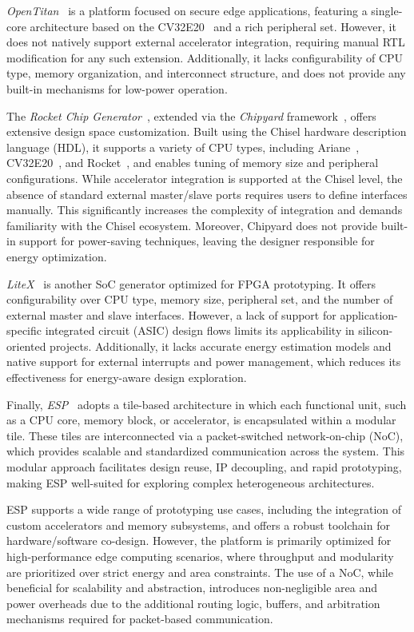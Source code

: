             \emph{OpenTitan}~\cite{opentitan} is a platform focused on secure edge applications, featuring a single-core architecture based on the CV32E20~\cite{zeroriscy} and a rich peripheral set. However, it does not natively support external accelerator integration, requiring manual RTL modification for any such extension. Additionally, it lacks configurability of CPU type, memory organization, and interconnect structure, and does not provide any built-in mechanisms for low-power operation.
            
            The \emph{Rocket Chip Generator}~\cite{rocket}, extended via the \emph{Chipyard} framework~\cite{chipyard}, offers extensive design space customization. Built using the Chisel hardware description language (HDL), it supports a variety of CPU types, including Ariane~\cite{ariane}, CV32E20~\cite{zeroriscy}, and Rocket~\cite{rocket}, and enables tuning of memory size and peripheral configurations. While accelerator integration is supported at the Chisel level, the absence of standard external master/slave ports requires users to define interfaces manually. This significantly increases the complexity of integration and demands familiarity with the Chisel ecosystem. Moreover, Chipyard does not provide built-in support for power-saving techniques, leaving the designer responsible for energy optimization.
            
            \emph{LiteX}~\cite{litex} is another SoC generator optimized for FPGA prototyping. It offers configurability over CPU type, memory size, peripheral set, and the number of external master and slave interfaces. However, a lack of support for application-specific integrated circuit (ASIC) design flows limits its applicability in silicon-oriented projects. Additionally, it lacks accurate energy estimation models and native support for external interrupts and power management, which reduces its effectiveness for energy-aware design exploration.
            
            Finally, \emph{ESP}~\cite{esp} adopts a tile-based architecture in which each functional unit, such as a CPU core, memory block, or accelerator, is encapsulated within a modular tile. These tiles are interconnected via a packet-switched network-on-chip (NoC), which provides scalable and standardized communication across the system. This modular approach facilitates design reuse, IP decoupling, and rapid prototyping, making ESP well-suited for exploring complex heterogeneous architectures.
            
            ESP supports a wide range of prototyping use cases, including the integration of custom accelerators and memory subsystems, and offers a robust toolchain for hardware/software co-design. However, the platform is primarily optimized for high-performance edge computing scenarios, where throughput and modularity are prioritized over strict energy and area constraints. The use of a NoC, while beneficial for scalability and abstraction, introduces non-negligible area and power overheads due to the additional routing logic, buffers, and arbitration mechanisms required for packet-based communication.
            

